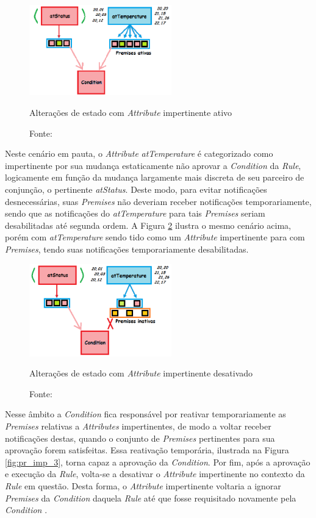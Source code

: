 \begin{figure}[!htb]
  \centering
  \includegraphics[width=0.55\textwidth]{../figures/pr_imp_1.png}
  \smallskip
  \caption{Alterações de estado com \textit{Attribute} impertinente ativo}
  \caption*{Fonte: }
  \label{fig:pr_imp_1}
\end{figure}

Neste cenário em pauta, o \textit{Attribute} \textit{atTemperature} é
categorizado como impertinente por sua mudança estaticamente não aprovar a
\textit{Condition} da \textit{Rule}, logicamente em função da mudança largamente
mais discreta de seu parceiro de conjunção, o pertinente \textit{atStatus}.
Deste modo, para evitar notificações desnecessárias, suas \textit{Premises} não
deveriam receber notificações temporariamente, sendo que as notificações do
\textit{atTemperature} para tais \textit{Premises} seriam desabilitadas até
segunda ordem. A Figura \ref{fig:pr_imp_2} ilustra o mesmo cenário acima, porém
com \textit{atTemperature} sendo tido como um \textit{Attribute} impertinente
para com \textit{Premises}, tendo suas notificações temporariamente
desabilitadas.

\begin{figure}[!htb]
  \centering
  \includegraphics[width=0.55\textwidth]{../figures/pr_imp_2.png}
  \smallskip
  \caption{Alterações de estado com \textit{Attribute} impertinente desativado}
  \caption*{Fonte: }
  \label{fig:pr_imp_2}
\end{figure}


Nesse âmbito a \textit{Condition} fica responsável por reativar temporariamente
as \textit{Premises} relativas a \textit{Attributes} impertinentes, de modo a
voltar receber notificações destas, quando o conjunto de \textit{Premises}
pertinentes para sua aprovação forem satisfeitas. Essa reativação temporária,
ilustrada na Figura \ref{fig:pr_imp_3}, torna capaz a aprovação da
\textit{Condition}. Por fim, após a aprovação e execução da \textit{Rule},
volta-se a desativar o \textit{Attribute} impertinente no contexto da
\textit{Rule} em questão. Desta forma, o \textit{Attribute} impertinente
voltaria a ignorar \textit{Premises} da \textit{Condition} daquela \textit{Rule}
até que fosse requisitado novamente pela \textit{Condition}
\cite{msc_Ronszcka_2012}.

